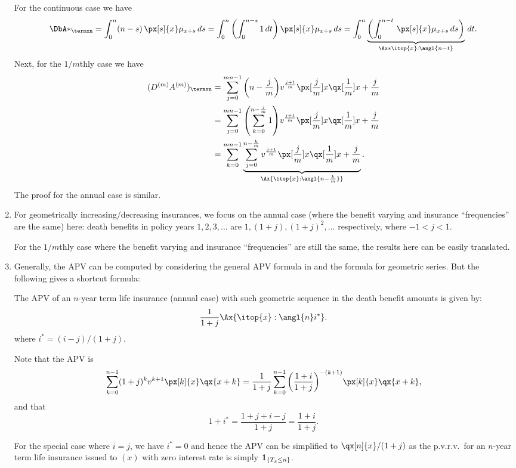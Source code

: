 \begin{enumerate}
\begin{pf}
For the continuous case we have
\[
\DbA*_{\termxn}=\int_{0}^{n}(n-s)\,\px[s]{x}\mu_{x+s}\,ds
=\int_{0}^{n}\qty(\int_{0}^{n-s}1\,dt)\,\px[s]{x}\mu_{x+s}\,ds
=\int_{0}^{n}\underbrace{\qty(\int_{0}^{n-t}\,\px[s]{x}\mu_{x+s}\,ds)}_{\Ax*{\itop{x}:\angl{n-t}}}\,dt.
\]
Next, for the \(1/m\)thly case we have
\begin{align*}
(D^{(m)}A^{(m)})_{\termxn}
&=\sum_{j=0}^{mn-1}\qty(n-\frac{j}{m})
v^{\frac{j+1}{m}}\px[\frac{j}{m}]{x}\qx[\frac{1}{m}]{x+\frac{j}{m}}\\
&=\sum_{j=0}^{mn-1}\qty(\sum_{k=0}^{n-\frac{j}{m}}1)v^{\frac{j+1}{m}}\px[\frac{j}{m}]{x}\qx[\frac{1}{m}]{x+\frac{j}{m}}\\
&=\sum_{k=0}^{mn-1}\underbrace{\sum_{j=0}^{n-\frac{k}{m}}v^{\frac{j+1}{m}}\px[\frac{j}{m}]{x}\qx[\frac{1}{m}]{x+\frac{j}{m}}}_{\Ax{\itop{x}:\angl{n-\frac{k}{m}}}}.
\end{align*}
The proof for the annual case is similar.
\end{pf}
\item \label{it:geo-vb-insurance-intro}
For geometrically increasing/decreasing insurances, we focus on the
annual case (where the benefit varying and insurance ``frequencies'' are the
same) here: death benefits in policy years \(1,2,3,\dotsc\) are
\(1,(1+j),(1+j)^2,\dotsc\) respectively, where \(-1<j<1\).

\begin{note}
For the \(1/m\)thly case where the benefit varying and insurance
``frequencies'' are still the same, the results here can be easily translated.
\end{note}
\item Generally, the APV can be computed by considering the general APV formula
in  and the formula for geometric series. But the
following gives a shortcut formula:
\begin{proposition}
\label{prp:gs-term-life-fmla}
The APV of an \(n\)-year term life insurance (annual case) with such geometric
sequence in the death benefit amounts is given by:
\[
\frac{1}{1+j}\Ax{\itop{x}:\angl{n}i^*}.
\]
where \(i^*=(i-j)/(1+j)\).
\end{proposition}
\begin{pf}
Note that the APV is
\[
\sum_{k=0}^{n-1}(1+j)^kv^{k+1}\px[k]{x}\qx{x+k}
=\frac{1}{1+j}\sum_{k=0}^{n-1}\qty(\frac{1+i}{1+j})^{-(k+1)}\px[k]{x}\qx{x+k},
\]
and that
\[
1+i^*=\frac{1+j+i-j}{1+j}=\frac{1+i}{1+j}.
\]
\end{pf}

\begin{note}
For the special case where \(i=j\), we have \(i^*=0\) and hence the APV can be
simplified to \(\qx[n]{x}/(1+j)\) as the p.v.r.v.\ for an \(n\)-year term life
insurance issued to \((x)\) with zero interest rate is simply
\(\mathbf{1}_{\left\{T_x\le n\right\}}\).
\end{note}
\end{enumerate}

